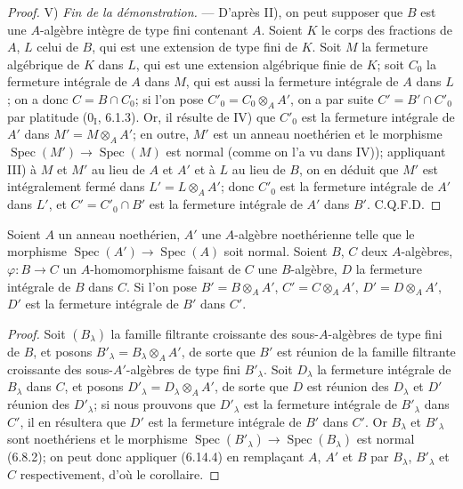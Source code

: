 \begin{proof}
V) \emph{Fin de la démonstration.} --- D'après II), on peut supposer que
$B$ est une $A$-algèbre intègre de type fini contenant $A$. Soient $K$ le
corps des fractions de $A$, $L$ celui de $B$, qui est une extension de type
fini de $K$. Soit $M$ la fermeture algébrique de $K$ dans $L$, qui est une
extension algébrique finie de $K$; soit $C_0$ la fermeture intégrale de $A$
dans $M$, qui est aussi la fermeture intégrale de $A$ dans $L$; on a donc
$C=B\cap C_0$; si l'on pose $C'_0=C_0\otimes_A A'$, on a par suite
$C'=B'\cap C'_0$ par platitude (0$_{\mathrm I}$, 6.1.3). Or, il résulte de
IV) que $C'_0$ est la fermeture intégrale de $A'$ dans
$M'=M\otimes_A A'$; en outre, $M'$ est un anneau noethérien et le morphisme
$\operatorname{Spec}(M')\to\operatorname{Spec}(M)$ est normal (comme on
l'a vu dans IV)); appliquant III) à $M$ et $M'$ au lieu de $A$ et $A'$ et
à $L$ au lieu de $B$, on en déduit que $M'$ est intégralement fermé dans
$L'=L\otimes_A A'$; donc $C'_0$ est la fermeture intégrale de $A'$ dans
$L'$, et $C'=C'_0\cap B'$ est la fermeture intégrale de $A'$ dans $B'$.
C.Q.F.D.
\end{proof}

\begin{corollary}[6.14.5]
\label{IV.2.s6.14.5-fr}
Soient $A$ un anneau noethérien, $A'$ une $A$-algèbre noethérienne telle
que le morphisme $\operatorname{Spec}(A')\to\operatorname{Spec}(A)$ soit
normal. Soient $B$, $C$ deux $A$-algèbres,
$\varphi:B\to C$ un $A$-homomorphisme faisant de $C$ une $B$-algèbre, $D$
la fermeture intégrale de $B$ dans $C$. Si l'on pose
$B'=B\otimes_A A'$, $C'=C\otimes_A A'$, $D'=D\otimes_A A'$, $D'$ est la
fermeture intégrale de $B'$ dans $C'$.
\end{corollary}

\begin{proof}
Soit $(B_\lambda)$ la famille filtrante croissante des sous-$A$-algèbres
de type fini de $B$, et posons $B'_\lambda=B_\lambda\otimes_A A'$, de
sorte que $B'$ est réunion de la famille filtrante croissante des
sous-$A'$-algèbres de type fini $B'_\lambda$. Soit $D_\lambda$ la
fermeture intégrale de $B_\lambda$ dans $C$, et posons
$D'_\lambda=D_\lambda\otimes_A A'$, de sorte que $D$ est réunion des
$D_\lambda$ et $D'$ réunion des $D'_\lambda$; si nous prouvons que
$D'_\lambda$ est la fermeture intégrale de $B'_\lambda$ dans $C'$, il en
résultera que $D'$ est la fermeture intégrale de $B'$ dans $C'$. Or
$B_\lambda$ et $B'_\lambda$ sont noethériens et le morphisme
$\operatorname{Spec}(B'_\lambda)\to\operatorname{Spec}(B_\lambda)$ est
normal (6.8.2); on peut donc appliquer (6.14.4) en remplaçant $A$, $A'$ et
$B$ par $B_\lambda$, $B'_\lambda$ et $C$ respectivement, d'où le
corollaire.
\end{proof}

